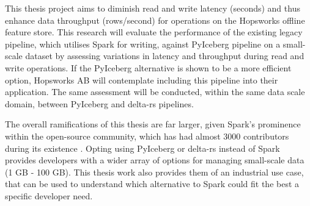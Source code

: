 This thesis project aims to diminish read and write latency (seconds) and thus enhance data throughput (rows/second) for operations on the Hopsworks offline feature store. This research will evaluate the performance of the existing legacy pipeline, which utilises Spark for writing, against PyIceberg pipeline on a small-scale dataset by assessing variations in latency and throughput during read and write operations. If the PyIceberg alternative is shown to be a more efficient option, Hopsworks AB will contemplate including this pipeline into their application. The same assessment will be conducted, within the same data scale domain, between PyIceberg and delta-rs pipelines.

The overall ramifications of this thesis are far larger, given Spark's prominence within the open-source community, which has had almost 3000 contributors during its existence \cite{ApacheSparkOpen}. Opting using PyIceberg or delta-rs instead of Spark provides developers with a wider array of options for managing small-scale data (1 GB - 100 GB). This thesis work also provides them of an industrial use case, that can be used to understand which alternative to Spark could fit the best a specific developer need.